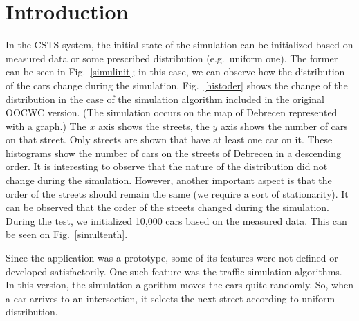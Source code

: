 \documentclass[b5paper,12pt]{report}
\theoremstyle{definition}
\begin{document}
\section{Introduction}
In the CSTS system, the initial state of the simulation can be initialized based on measured data or some prescribed distribution (e.g.~uniform one). The former can be seen in Fig.~\ref{simulinit}; in this case, we can observe how the distribution of the cars change during the simulation. Fig.~\ref{histoder} shows the change of the distribution in the case of the simulation algorithm included in the original OOCWC version. (The simulation occurs on the map of Debrecen represented with a graph.) The $x$ axis shows the streets, the $y$ axis shows the number of cars on that street. Only streets are shown that have at least one car on it. These histograms show the number of cars on the streets of Debrecen in a descending order. It is interesting to observe that the nature of the distribution did not change during the simulation. However, another important aspect is that the order of the streets should remain the same (we require a sort of stationarity). It can be observed that the order of the streets changed during the simulation. During the test, we initialized 10,000 cars based on the measured data. This can be seen on Fig.~\ref{simultenth}.

Since the application was a prototype, some of its features were not defined or developed satisfactorily. One such feature was the traffic simulation algorithms. In this version, the simulation algorithm moves the cars quite randomly. So, when a car arrives to an intersection, it selects the next street according to uniform distribution.
\end{document}
